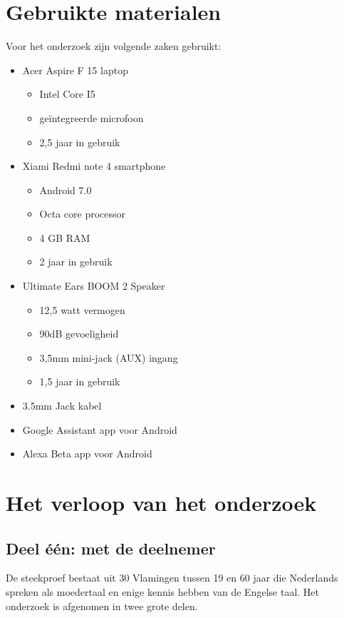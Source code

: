\section{Gebruikte materialen}
Voor het onderzoek zijn volgende zaken gebruikt:
\begin{itemize}
    \item Acer Aspire F 15 laptop
    \begin{itemize}
        \item Intel Core I5
        \item geïntegreerde microfoon
        \item 2,5 jaar in gebruik
    \end{itemize}
    \item Xiami Redmi note 4 smartphone
    \begin{itemize}
        \item Android 7.0
        \item Octa core processor
        \item 4 GB RAM
        \item 2 jaar in gebruik
    \end{itemize}
    \item Ultimate Ears BOOM 2 Speaker
    \begin{itemize}
        \item 12,5 watt vermogen
        \item 90dB gevoeligheid
        \item 3,5mm mini-jack (AUX) ingang
        \item 1,5 jaar in gebruik
    \end{itemize}
    \item 3.5mm Jack kabel
    \item Google Assistant app voor Android
    \item Alexa Beta app voor Android
\end{itemize}

\section{Het verloop van het onderzoek}
\subsection{Deel één: met de deelnemer}
De steekproef bestaat uit 30 Vlamingen tussen 19 en 60 jaar die Nederlands spreken als moedertaal en enige kennis hebben van de Engelse taal. Het onderzoek is afgenomen in twee grote delen.

